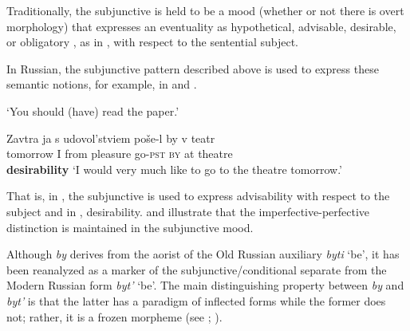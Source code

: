 \documentclass[output=paper,
modfonts,
newtxmath,
hidelinks,
]{langscibook}
\begin{document}
\noindent Traditionally, the subjunctive is held to be a mood (whether or not there is overt morphology) that expresses an eventuality as hypothetical, advisable, desirable, or obligatory \citep[142]{HarrisonLeFleming2000}, as in , with respect to the sentential subject.\largerpage[-1]

\ea \label{10:ex7}
    \hfill \citep[142]{HarrisonLeFleming2000}
	\z
\z

\noindent In Russian, the subjunctive pattern described above is used to express these semantic notions, for example, in  and .

\ea \label{10:ex8}
	\z
        \glt `You should (have) read the paper.'\hfill\citep[142]{HarrisonLeFleming2000}
\z

\ea \label{10:ex9}
\gll Zavtra ja s udovol’stviem poše-l by v teatr\\
     tomorrow I from pleasure go\textsc{-pst} \textsc{by} at theatre\\\hfill\textbf{desirability}
\glt `I would very much like to go to the theatre tomorrow.'
\z

\noindent That is, in , the subjunctive is used to express advisability with respect to the subject and in , desirability.  and  illustrate that the imperfective-perfective distinction is maintained in the subjunctive mood.

Although \textit{by} derives from the aorist of the Old Russian auxiliary \textit{byti} ‘be’, it has been reanalyzed as a marker of the subjunctive/conditional separate from the Modern Russian form \textit{byt’} ‘be’. The main distinguishing property between \textit{by} and \textit{byt’} is that the latter has a paradigm of inflected forms while the former does not; rather, it is a frozen morpheme (see \citealt{Spencer2001}; \citealt{Mezhevich2006}).
\end{document}
